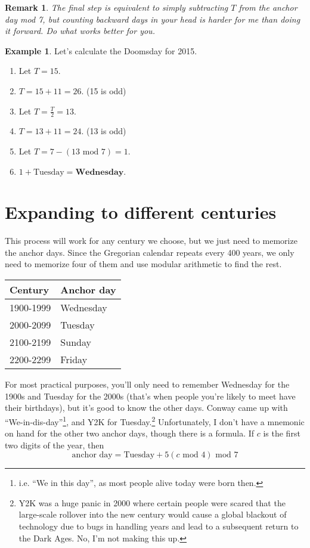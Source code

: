 \documentclass[12pt,letterpaper]{article}
\theoremstyle{plain}
\newtheorem*{remark}{Remark}
\theoremstyle{definition}
\newtheorem{example}{Example}
\begin{document}
\begin{remark}
	The final step is equivalent to simply subtracting \(T\) from the anchor day mod 7, but counting backward days in your head is harder for me than doing it forward. Do what works better for you. 
\end{remark}

\begin{example}
	Let's calculate the Doomsday for 2015. 

	\begin{enumerate}
		\item Let \(T=15\).
		\item \(T=15+11=26\). (15 is odd)
		\item Let \(T=\frac{T}{2}=13\). 
		\item \(T=13+11=24\). (13 is odd)
		\item Let \(T=7-(13 \text{ mod } 7)=1\). 
		\item \(1+\text{Tuesday}=\textbf{Wednesday}\). 
	\end{enumerate}
\end{example}

\section{Expanding to different centuries}

This process will work for any century we choose, but we just need to memorize the anchor days. Since the Gregorian calendar repeats every 400 years, we only need to memorize four of them and use modular arithmetic to find the rest. 

\begin{center}
	\begin{tabular}{l|l}
	Century   & Anchor day \\ \hline
	1900-1999 & Wednesday  \\
	2000-2099 & Tuesday    \\
	2100-2199 & Sunday     \\
	2200-2299 & Friday    
	\end{tabular}
\end{center}

For most practical purposes, you'll only need to remember Wednesday for the 1900s and Tuesday for the 2000s (that's when people you're likely to meet have their birthdays), but it's good to know the other days. Conway came up with ``We-in-dis-day''\footnote{i.e. ``We in this day'', as most people alive today were born then.}, and Y2K for Tuesday.\footnote{Y2K was a huge panic in 2000 where certain people were scared that the large-scale rollover into the new century would cause a global blackout of technology due to bugs in handling years and lead to a subsequent return to the Dark Ages. No, I'm not making this up.} Unfortunately, I don't have a mnemonic on hand for the other two anchor days, though there is a formula. If \(c\) is the first two digits of the year, then 
\[\text{anchor day}=\text{Tuesday}+5(c\text{ mod } 4)\text{ mod } 7\]
\end{document}
